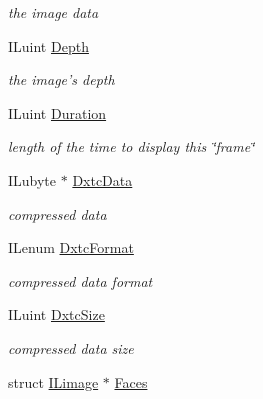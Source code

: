 \begin{DoxyCompactItemize}
\begin{DoxyCompactList}\small\item\em the image data \end{DoxyCompactList}\item 
\hypertarget{struct_i_limage_a2a4c47a9713bee335a0830b336bdc951}{I\+Luint \hyperlink{struct_i_limage_a2a4c47a9713bee335a0830b336bdc951}{Depth}}\label{struct_i_limage_a2a4c47a9713bee335a0830b336bdc951}

\begin{DoxyCompactList}\small\item\em the image's depth \end{DoxyCompactList}\item 
\hypertarget{struct_i_limage_ae10866868b7cebc0e7be76b72de2c528}{I\+Luint \hyperlink{struct_i_limage_ae10866868b7cebc0e7be76b72de2c528}{Duration}}\label{struct_i_limage_ae10866868b7cebc0e7be76b72de2c528}

\begin{DoxyCompactList}\small\item\em length of the time to display this \char`\"{}frame\char`\"{} \end{DoxyCompactList}\item 
\hypertarget{struct_i_limage_a1009725f04fa7e66a567a011f3886cd8}{I\+Lubyte $\ast$ \hyperlink{struct_i_limage_a1009725f04fa7e66a567a011f3886cd8}{Dxtc\+Data}}\label{struct_i_limage_a1009725f04fa7e66a567a011f3886cd8}

\begin{DoxyCompactList}\small\item\em compressed data \end{DoxyCompactList}\item 
\hypertarget{struct_i_limage_a3b755d25246f67df6805c2921e7f5dd9}{I\+Lenum \hyperlink{struct_i_limage_a3b755d25246f67df6805c2921e7f5dd9}{Dxtc\+Format}}\label{struct_i_limage_a3b755d25246f67df6805c2921e7f5dd9}

\begin{DoxyCompactList}\small\item\em compressed data format \end{DoxyCompactList}\item 
\hypertarget{struct_i_limage_a22a07ef5328eedcf9b6ba7cecd498ec3}{I\+Luint \hyperlink{struct_i_limage_a22a07ef5328eedcf9b6ba7cecd498ec3}{Dxtc\+Size}}\label{struct_i_limage_a22a07ef5328eedcf9b6ba7cecd498ec3}

\begin{DoxyCompactList}\small\item\em compressed data size \end{DoxyCompactList}\item 
\hypertarget{struct_i_limage_aa7050b85a7ab3fc70b21ce7bf64fb411}{struct \hyperlink{struct_i_limage}{I\+Limage} $\ast$ \hyperlink{struct_i_limage_aa7050b85a7ab3fc70b21ce7bf64fb411}{Faces}}\label{struct_i_limage_aa7050b85a7ab3fc70b21ce7bf64fb411}


\end{DoxyCompactItemize}
